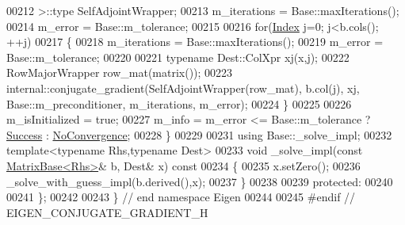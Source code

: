 \begin{DoxyCode}
00212                                           >::type SelfAdjointWrapper;
00213     m\_iterations = Base::maxIterations();
00214     m\_error = Base::m\_tolerance;
00215 
00216     \textcolor{keywordflow}{for}(\hyperlink{namespace_eigen_a62e77e0933482dafde8fe197d9a2cfde}{Index} j=0; j<b.cols(); ++j)
00217     \{
00218       m\_iterations = Base::maxIterations();
00219       m\_error = Base::m\_tolerance;
00220 
00221       \textcolor{keyword}{typename} Dest::ColXpr xj(x,j);
00222       RowMajorWrapper row\_mat(matrix());
00223       internal::conjugate\_gradient(SelfAdjointWrapper(row\_mat), b.col(j), xj, Base::m\_preconditioner, 
      m\_iterations, m\_error);
00224     \}
00225 
00226     m\_isInitialized = \textcolor{keyword}{true};
00227     m\_info = m\_error <= Base::m\_tolerance ? \hyperlink{group__enums_gga85fad7b87587764e5cf6b513a9e0ee5ea52581b035f4b59c203b8ff999ef5fcea}{Success} : \hyperlink{group__enums_gga85fad7b87587764e5cf6b513a9e0ee5eaba1c8763d1179778070f365ecc4157a8}{NoConvergence};
00228   \}
00229   
00231   \textcolor{keyword}{using} Base::\_solve\_impl;
00232   \textcolor{keyword}{template}<\textcolor{keyword}{typename} Rhs,\textcolor{keyword}{typename} Dest>
00233   \textcolor{keywordtype}{void} \_solve\_impl(\textcolor{keyword}{const} \hyperlink{group___core___module_class_eigen_1_1_matrix_base}{MatrixBase<Rhs>}& b, Dest& x)\textcolor{keyword}{ const}
00234 \textcolor{keyword}{  }\{
00235     x.setZero();
00236     \_solve\_with\_guess\_impl(b.derived(),x);
00237   \}
00238 
00239 \textcolor{keyword}{protected}:
00240 
00241 \};
00242 
00243 \} \textcolor{comment}{// end namespace Eigen}
00244 
00245 \textcolor{preprocessor}{#endif // EIGEN\_CONJUGATE\_GRADIENT\_H}
\end{DoxyCode}
